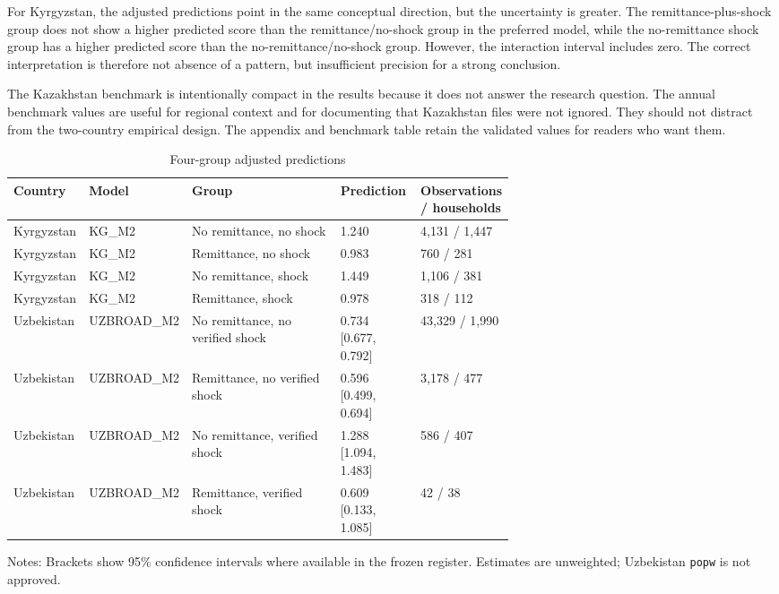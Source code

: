 \documentclass[11pt]{article}
\begin{document}
For Kyrgyzstan, the adjusted predictions point in the same conceptual direction, but the uncertainty is greater. The remittance-plus-shock group does not show a higher predicted score than the remittance/no-shock group in the preferred model, while the no-remittance shock group has a higher predicted score than the no-remittance/no-shock group. However, the interaction interval includes zero. The correct interpretation is therefore not absence of a pattern, but insufficient precision for a strong conclusion.

The Kazakhstan benchmark is intentionally compact in the results because it does not answer the research question. The annual benchmark values are useful for regional context and for documenting that Kazakhstan files were not ignored. They should not distract from the two-country empirical design. The appendix and benchmark table retain the validated values for readers who want them.

\begin{table}[!htbp]
\centering
\caption{Four-group adjusted predictions}
\label{tab:fourgroups}
\footnotesize
\setlength{\tabcolsep}{5pt}
\begin{tabularx}{\linewidth}{p{0.15\linewidth} p{0.16\linewidth} X p{0.16\linewidth} p{0.18\linewidth}}
\toprule
Country & Model & Group & Prediction & Observations / households \\
\midrule
Kyrgyzstan & KG\_M2 & No remittance, no shock & 1.240 & 4,131 / 1,447 \\
Kyrgyzstan & KG\_M2 & Remittance, no shock & 0.983 & 760 / 281 \\
Kyrgyzstan & KG\_M2 & No remittance, shock & 1.449 & 1,106 / 381 \\
Kyrgyzstan & KG\_M2 & Remittance, shock & 0.978 & 318 / 112 \\
Uzbekistan & UZBROAD\_M2 & No remittance, no verified shock & 0.734 [0.677, 0.792] & 43,329 / 1,990 \\
Uzbekistan & UZBROAD\_M2 & Remittance, no verified shock & 0.596 [0.499, 0.694] & 3,178 / 477 \\
Uzbekistan & UZBROAD\_M2 & No remittance, verified shock & 1.288 [1.094, 1.483] & 586 / 407 \\
Uzbekistan & UZBROAD\_M2 & Remittance, verified shock & 0.609 [0.133, 1.085] & 42 / 38 \\
\bottomrule
\end{tabularx}
\begin{minipage}{0.95\linewidth}\footnotesize Notes: Brackets show 95\% confidence intervals where available in the frozen register. Estimates are unweighted; Uzbekistan \texttt{popw} is not approved.\end{minipage}
\end{table}
\end{document}
